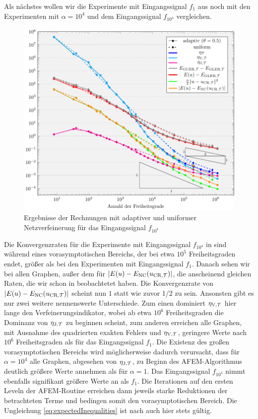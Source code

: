 Als nächstes wollen wir die Experimente mit Eingangssignal $f_1$ aus
 noch mit den Experimenten mit $\alpha=10^4$ und dem
Eingangssignal $f_{10^4}$ vergleichen.
\begin{figure}[p]
  \centering
  \includegraphics[width=.8\linewidth]
    {pictures/chapExperiments/secExactSol/f01LargeAlpha/conv.pdf}
  \caption{Ergebnisse der Rechnungen mit adaptiver und uniformer 
    Netzverfeinerung für das Eingangssignal $f_{10^4}$}
  \label{fig:f01LargeAlphaConvergence}
\end{figure}
Die Konvergenzraten für die Experimente mit Eingangssignal $f_{10^4}$ in
 sind während eines vorasymptotischen
Bereichs, der bei etwa $10^5$ Freiheitsgraden endet, größer als bei
den Experimenten mit Eingangssignal $f_1$.
Danach sehen wir bei allen Graphen, außer dem für $|E(u)-E_\textup{NC}(u_{\textup{CR}, \mathcal{T}})|$, die
anscheinend gleichen Raten, die wir schon in 
beobachtetet haben. 
Die Konvergenzrate von $|E(u)-E_\textup{NC}(u_{\textup{CR}, \mathcal{T}})|$ scheint nun $1$ statt wie zuvor
1/2 zu sein.
Ansonsten gibt es nur zwei weitere nennenswerte Unterschiede.
Zum einen dominiert $\eta_{\textup{V}, \mathcal{T}}$ hier lange den Verfeinerungsindikator, 
wobei ab etwa $10^6$ Freiheitsgraden die Dominanz von $\eta_{\textup{J}, \mathcal{T}}$ zu 
beginnen scheint, zum anderen erreichen alle Graphen, mit Ausnahme des
quadrierten exakten Fehlers und $\eta_{\textup{V}, \mathcal{T}}$, geringere Werte nach $10^6$
Freiheitsgraden als für das Eingangssignal $f_1$.
Die Existenz des großen vorasymptotischen Bereichs wird möglicherweise dadurch
verursacht, dass für $\alpha=10^4$ alle Graphen, abgesehen von
$\eta_{\textup{J}, \mathcal{T}}$, zu Beginn des AFEM-Algorithmus deutlich größere Werte annehmen als für 
$\alpha =1$. 
Das Eingangssignal $f_{10^4}$ nimmt ebenfalls signifikant größere Werte an als
$f_1$.
Die Iterationen auf den ersten Leveln der AFEM-Routine erreichen dann jeweils
starke Reduktionen der betrachteten Terme und bedingen somit den
vorasymptotischen Bereich.
Die Ungleichung \eqref{eq:expectedInequalities} ist nach
 auch hier stets gültig.

